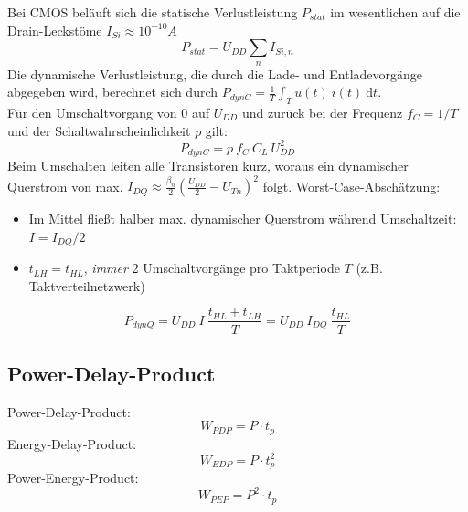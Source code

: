 \documentclass[a4paper,11pt]{article}
\begin{document}
\raggedright
Bei CMOS beläuft sich die statische Verlustleistung $P_{stat}$ im wesentlichen auf die Drain-Leckstöme $I_{Si}\approx10^{-10}A$
\[ \boxed{P_{stat}=U_{DD}\sum_n I_{Si,n}} \]
Die dynamische Verlustleistung, die durch die Lade- und Entladevorgänge abgegeben wird, berechnet sich durch $P_{dynC}=\frac{1}{T}\displaystyle\int_T u(t) ~ i(t) ~ \mathrm{d}t$.\\
Für den Umschaltvorgang von $0$ auf $U_{DD}$ und zurück bei der Frequenz $f_C=1/T$ und der Schaltwahrscheinlichkeit $p$ gilt:
\[ \boxed{P_{dynC}=p\ f_C\ C_L \ U_{DD}^2} \]
Beim Umschalten leiten alle Transistoren kurz, woraus ein dynamischer Querstrom von max. $I_{DQ}\approx\frac{\beta_n}{2}\left(\frac{U_{DD}}{2}-U_{Tn}\right)^2$ folgt. Worst-Case-Abschätzung:
\begin{itemize}
\item Im Mittel fließt halber max. dynamischer Querstrom während Umschaltzeit: $I = I_{DQ} / 2$
\item $t_{LH} = t_{HL}$, \textit{immer} 2 Umschaltvorgänge pro Taktperiode $T$ (z.B. Taktverteilnetzwerk)
\end{itemize}
\[ P_{dynQ} = U_{DD} ~ I ~ \frac{t_{HL} + t_{LH}}{T} = U_{DD} ~ I_{DQ} ~ \frac{t_{HL}}{T} \] 

\subsection*{Power-Delay-Product}
\begin{multicols}{3}
\centering
	Power-Delay-Product: \[ \boxed{W_{PDP}=P\cdot t_p} \]
	Energy-Delay-Product: \[ \boxed{W_{EDP}=P\cdot t_p^2} \]
	Power-Energy-Product: \[ \boxed{W_{PEP}=P^2\cdot t_p} \]
\end{multicols}

\newpage
\end{document}
